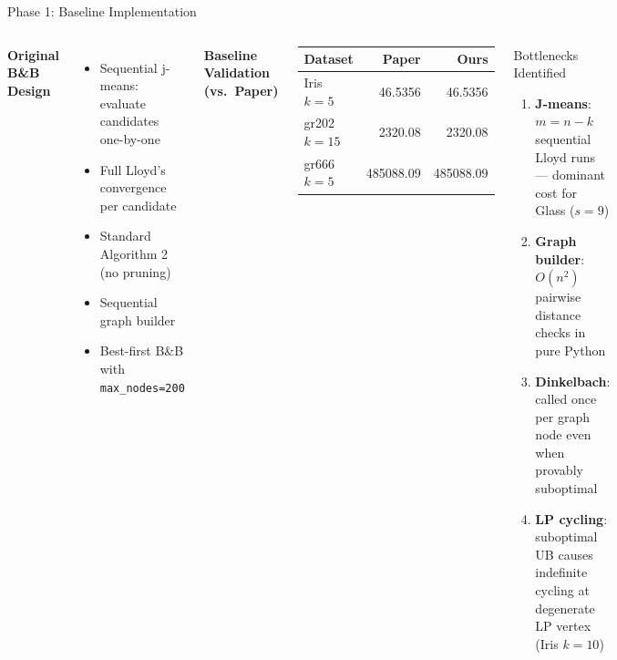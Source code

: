\documentclass[aspectratio=169,12pt]{beamer}
\begin{document}
\begin{frame}{Phase 1: Baseline Implementation}
  \begin{columns}[T]
      \textbf{Original B\&B Design}
      \begin{itemize}
        \item Sequential j-means: evaluate candidates one-by-one
        \item Full Lloyd's convergence per candidate
        \item Standard Algorithm 2 (no pruning)
        \item Sequential graph builder
        \item Best-first B\&B with \texttt{max\_nodes=200}
      \end{itemize}

      \vspace{0.4em}
      \textbf{Baseline Validation (vs.\ Paper)}
      \begin{center}\small
      \begin{tabular}{lrr}
        \toprule
        Dataset & Paper & Ours \\
        \midrule
        Iris $k=5$ & 46.5356 & 46.5356 \\
        gr202 $k=15$ & 2320.08 & 2320.08 \\
        gr666 $k=5$ & 485088.09 & 485088.09 \\
        \bottomrule
      \end{tabular}
      \end{center}

      \begin{alertblock}{Bottlenecks Identified}
        \begin{enumerate}
          \item \textbf{J-means}: $m=n-k$ sequential Lloyd runs — dominant cost for Glass ($s=9$)
          \item \textbf{Graph builder}: $O(n^2)$ pairwise distance checks in pure Python
          \item \textbf{Dinkelbach}: called once per graph node even when provably suboptimal
          \item \textbf{LP cycling}: suboptimal UB causes indefinite cycling at degenerate LP vertex (Iris $k=10$)
        \end{enumerate}
      \end{alertblock}
  \end{columns}
\end{frame}
\end{document}
